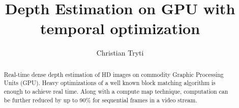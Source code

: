 \documentclass[twoside,openright,a4paper,12pt]{report}
\title{Depth Estimation on GPU with temporal optimization}
\author{Christian Tryti}
\date{} %
\begin{document}
\uiosloforside[kind=Master's Thesis]


\maketitle

\clearpage
{}

\begin{abstract}
  Real-time dense depth estimation of HD images on commodity Graphic
  Processing Units (GPU). Heavy optimizations of a well known block
  matching algorithm is enough to achieve real time. Along with a
  compute map technique, computation can be further reduced by up to
  90\% for sequential frames in a video stream.
\end{abstract}

\tableofcontents{}
\listoffigures{}
\listoftables{}


\clearpage{}








\appendix







\end{document}
